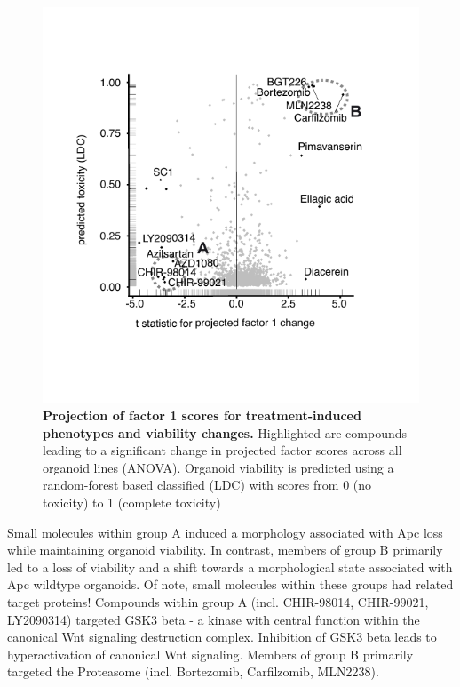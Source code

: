 \begin{flushleft}
\begin{figure}[h]
\centering
\includegraphics[scale=0.75,
                keepaspectratio]{figures/adenomaprofiling/pdf/fig_2_3.pdf}
\caption{\textbf{Projection of factor 1 scores for treatment-induced phenotypes and viability changes.} Highlighted are compounds leading to a significant change in projected factor scores across all organoid lines (ANOVA). Organoid viability is predicted using a random-forest based classified (LDC) with scores from 0 (no toxicity) to 1 (complete toxicity)}
\label{fig_180}
\end{figure}
\bigbreak

Small molecules within group A induced a morphology associated with Apc loss while maintaining organoid viability. In contrast, members of group B primarily led to a loss of viability and a shift towards a morphological state associated with Apc wildtype organoids. Of note, small molecules within these groups had related target proteins! Compounds within group A (incl. CHIR-98014, CHIR-99021, LY2090314) targeted GSK3 beta - a kinase with central function within the canonical Wnt signaling destruction complex. Inhibition of GSK3 beta leads to hyperactivation of canonical Wnt signaling. %
Members of group B primarily targeted the Proteasome (incl. Bortezomib, Carfilzomib, MLN2238).


\end{flushleft}
